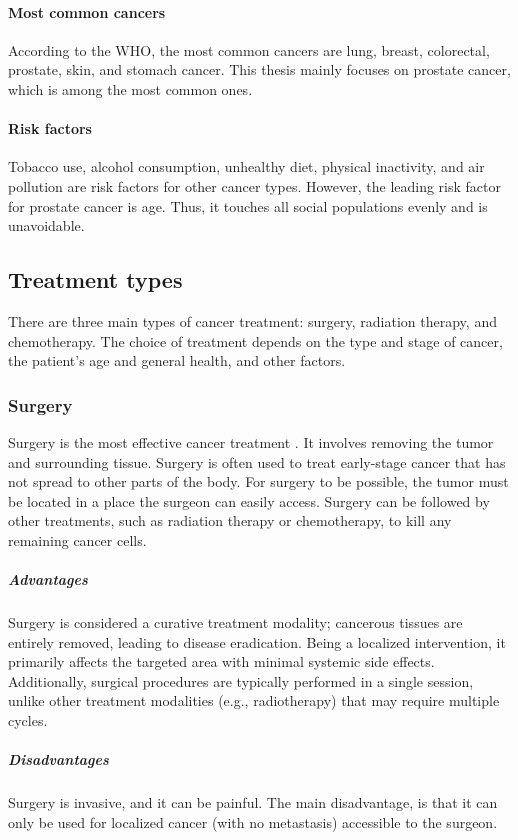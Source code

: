 \paragraph{Most common cancers}
According to the WHO, the most common cancers are lung, breast, colorectal, prostate, skin, and stomach cancer.
This thesis mainly focuses on prostate cancer, which is among the most common ones.

\paragraph{Risk factors}
Tobacco use, alcohol consumption, unhealthy diet, physical inactivity, and air pollution are risk factors for other cancer types.
However, the leading risk factor for prostate cancer is age.
Thus, it touches all social populations evenly and is unavoidable.

\subsection{Treatment types}
There are three main types of cancer treatment: surgery, radiation therapy, and chemotherapy.
The choice of treatment depends on the type and stage of cancer, the patient's age and general health, and other factors.

\subsubsection{Surgery}
Surgery is the most effective cancer treatment \cite{Klein2009}.
It involves removing the tumor and surrounding tissue.
Surgery is often used to treat early-stage cancer that has not spread to other parts of the body.
For surgery to be possible, the tumor must be located in a place the surgeon can easily access.
Surgery can be followed by other treatments, such as radiation therapy or chemotherapy, to kill any remaining cancer cells.

\subparagraph{Advantages}
Surgery is considered a curative treatment modality; cancerous tissues are entirely removed, leading to disease eradication.
Being a localized intervention, it primarily affects the targeted area with minimal systemic side effects.
Additionally, surgical procedures are typically performed in a single session, unlike other treatment modalities (e.g., radiotherapy) that may require multiple cycles.

\subparagraph{Disadvantages}
Surgery is invasive, and it can be painful.
The main disadvantage, is that it can only be used for localized cancer (with no metastasis) accessible to the surgeon.

